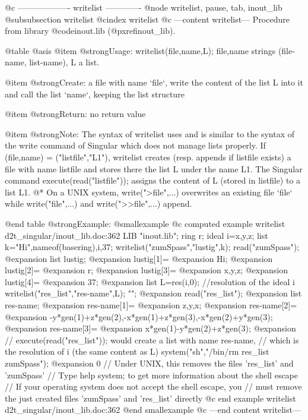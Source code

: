 @c ------------------- writelist -------------
@node writelist, pause, tab, inout_lib
@subsubsection writelist
@cindex writelist
@c ---content writelist---
Procedure from library @code{inout.lib} (@pxref{inout_lib}).

@table @asis
@item @strong{Usage:}
writelist(file,name,L); file,name strings (file-name, list-name),
L a list.

@item @strong{Create:}
a file with name `file`, write the content of the list L into it and
call the list `name`, keeping the list structure

@item @strong{Return:}
no return value

@item @strong{Note:}
The syntax of writelist uses and is similar to the syntax of the
write command of Singular which does not manage lists properly.
If (file,name) = ("listfile","L1"), writelist creates (resp.
appends if listfile exists) a file with name listfile and stores
there the list L under the name L1. The Singular command
execute(read("listfile")); assigns the content of L (stored in
listfile) to a list L1.
@* On a UNIX system, write(">file",...) overwrites an existing file
`file` while write("file",...) and write(">>file",...) append.

@end table
@strong{Example:}
@smallexample
@c computed example writelist d2t_singular/inout_lib.doc:362 
LIB "inout.lib";
ring r;
ideal i=x,y,z;
list k="Hi",nameof(basering),i,37;
writelist("zumSpass","lustig",k);
read("zumSpass");
@expansion{} list lustig;
@expansion{}    lustig[1]=
@expansion{} Hi;
@expansion{}    lustig[2]=
@expansion{} r;
@expansion{}    lustig[3]=
@expansion{} x,y,z;
@expansion{}    lustig[4]=
@expansion{} 37;
@expansion{} 
list L=res(i,0);                    //resolution of the ideal i
writelist("res_list","res-name",L); "";
@expansion{} 
read("res_list");
@expansion{} list res-name;
@expansion{}    res-name[1]=
@expansion{} z,y,x;
@expansion{}    res-name[2]=
@expansion{} -y*gen(1)+z*gen(2),-x*gen(1)+z*gen(3),-x*gen(2)+y*gen(3);
@expansion{}    res-name[3]=
@expansion{} x*gen(1)-y*gen(2)+z*gen(3);
@expansion{} 
// execute(read("res_list")); would create a list with name res-name,
// which is the resolution of i (the same content as L)
system("sh","/bin/rm res_list zumSpass");
@expansion{} 0
// Under UNIX, this removes the files 'res_list' and 'zumSpass'
// Type help system; to get more information about the shell escape
// If your operating system does not accept the shell escape, you
// must remove the just created files 'zumSpass' and 'res_list' directly
@c end example writelist d2t_singular/inout_lib.doc:362
@end smallexample
@c ---end content writelist---

